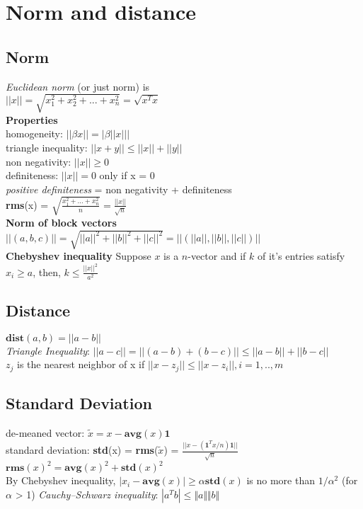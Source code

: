\section{Norm and distance}
\subsection{Norm} 
\textit{Euclidean norm} (or just norm) is\\
$||x||= \sqrt{x_1^2+x_2^2+...+x_n^2}= \sqrt{x^Tx}$\\
\textbf{Properties}\\
\textbullet homogeneity: $||\beta x|| = |\beta ||x|||$\\
\textbullet triangle inequality: $||x + y|| \leq ||x|| + ||y||$\\
\textbullet non negativity: $||x|| \geq 0$\\
\textbullet definiteness: $||x|| = 0$ only if x = 0\\
\textit{positive definiteness} = non negativity + definiteness\\
\textbf{rms}(x) = $\sqrt{\frac{x_1^2+...+x_n^2}{n}} = \frac{||x||}{\sqrt{n}}$ \\
\textbf{Norm of block vectors}
$||(a,b,c)|| = \sqrt{||a||^2 + ||b||^2 + ||c||^2} = ||(||a||, ||b||, ||c||)||$\\
\textbf{Chebyshev inequality}
Suppose $x$ is a $n$-vector and if $k$ of it's entries satisfy $x_{i} \geq a$, then, 
$k \leq \frac{||x||^{2}}{a^{2}}$
\subsection{Distance}
$\textbf{dist}(a,b) = ||a - b||$\\
\textit{Triangle Inequality}: $||a - c|| = ||(a - b) + (b - c)|| \leq ||a-b|| + ||b-c||$\\
$z_j$ is the nearest neighbor of x if $||x-z_j|| \leq ||x-z_i||, i=1,..,m$\\

\subsection{Standard Deviation}
de-meaned vector: $\tilde{x} = x - \textbf{avg}(x)\textbf{1}$\\
standard deviation: \textbf{std}(x) = \textbf{rms}($\tilde{x}$) = $\frac{||x - (\textbf{1}^Tx/n)\textbf{1}||}{\sqrt{n}}$\\
${\textbf{rms}(x)}^2 = {\textbf{avg}(x)}^2 + {\textbf{std}(x)}^2$\\
By Chebyshev inequality, $|x_i - \textbf{avg}(x)| \geq \alpha \textbf{std}(x)$ is no more than $1/\alpha^2$ (for 
$\alpha$ > 1)
\textit{Cauchy–Schwarz inequality}: $|a^Tb| \leq \Vert a\Vert \Vert b \Vert$
